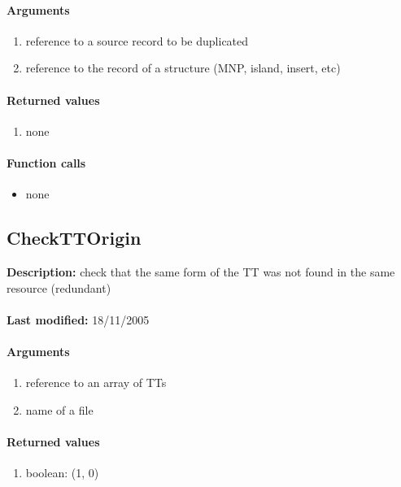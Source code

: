 \paragraph{Arguments}
\begin{enumerate}
\item reference to a source record to be duplicated
\item reference to the record of a structure (MNP, island, insert, etc)
\end{enumerate}

\paragraph{Returned values}
\begin{enumerate}
\item none
\end{enumerate}

\paragraph{Function calls}
\begin{itemize}
\item none
\end{itemize}

\subsection{CheckTTOrigin}
\textbf{Description:} check that the same form of the TT was not found in the same resource (redundant)\\
\\\textbf{Last modified:} 18/11/2005

\paragraph{Arguments}
\begin{enumerate}
\item reference to an array of TTs
\item name of a file
\end{enumerate}

\paragraph{Returned values}
\begin{enumerate}
\item boolean: (1, 0)
\end{enumerate}

